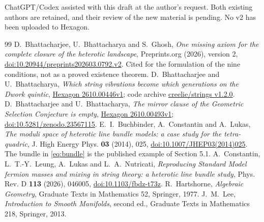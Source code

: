 ChatGPT/Codex assisted with this draft at the author's request. Both
existing authors are retained, and their review of the new material is
pending. No v2 has been uploaded to Hexagon.

\begin{thebibliography}{99}
 D.~Bhattacharjee, U.~Bhattacharya and S.~Ghosh,
\emph{One missing axiom for the complete closure of the heterotic landscape},
Preprints.org (2026), version 2,
\href{https://doi.org/10.20944/preprints202603.0792.v2}{doi:10.20944/preprints202603.0792.v2}.
Cited for the formulation of the nine conditions, not as a proved
existence theorem.
 D.~Bhattacharjee and U.~Bhattacharya,
\emph{Which string vibrations become which generations on the Dwork quintic},
\href{https://hexagonmath.org/2610.00446v1}{Hexagon 2610.00446v1};
code archive \href{https://github.com/creelie/strings/releases/tag/v1.2.0}{creelie/strings v1.2.0}.
 D.~Bhattacharjee and U.~Bhattacharya,
\emph{The mirror clause of the Geometric Selection Conjecture is empty},
\href{https://hexagonmath.org/2610.00493v1}{Hexagon 2610.00493v1};
\href{https://doi.org/10.5281/zenodo.23567115}{doi:10.5281/zenodo.23567115}.
 E.~I.~Buchbinder, A.~Constantin and A.~Lukas,
\emph{The moduli space of heterotic line bundle models: a case study for the
tetra-quadric}, J. High Energy Phys. \textbf{03} (2014), 025,
\href{https://doi.org/10.1007/JHEP03(2014)025}{doi:10.1007/JHEP03(2014)025}.
The bundle in \eqref{eq:bundle} is the published example of Section 5.1.
 A.~Constantin, L.~T.-Y.~Leung, A.~Lukas and L.~A.~Nutricati,
\emph{Reproducing Standard Model fermion masses and mixing in string theory:
a heterotic line bundle study}, Phys. Rev. D \textbf{113} (2026), 046005,
\href{https://doi.org/10.1103/fbdz-t73z}{doi:10.1103/fbdz-t73z}.
 R.~Hartshorne, \emph{Algebraic Geometry},
Graduate Texts in Mathematics 52, Springer, 1977.
 J.~M.~Lee, \emph{Introduction to Smooth Manifolds},
second ed., Graduate Texts in Mathematics 218, Springer, 2013.
\end{thebibliography}
